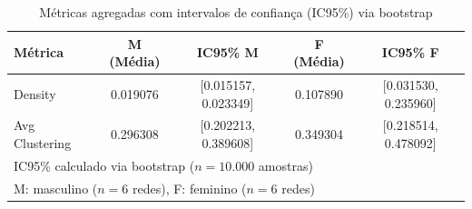 \begin{table}[H]
\centering
\small
\caption{Métricas agregadas com intervalos de confiança (IC95\%) via bootstrap}
\label{tab:confidence_intervals}
\begin{tabular}{lcccc}
\hline
\textbf{Métrica} & \textbf{M (Média)} & \textbf{IC95\% M} & \textbf{F (Média)} & \textbf{IC95\% F} \\
\hline
Density & 0.019076 & [0.015157, 0.023349] & 0.107890 & [0.031530, 0.235960] \\
Avg Clustering & 0.296308 & [0.202213, 0.389608] & 0.349304 & [0.218514, 0.478092] \\
\hline
\multicolumn{5}{l}{\footnotesize IC95\% calculado via bootstrap ($n=10.000$ amostras)} \\
\multicolumn{5}{l}{\footnotesize M: masculino ($n=6$ redes), F: feminino ($n=6$ redes)} \\
\end{tabular}
\end{table}
